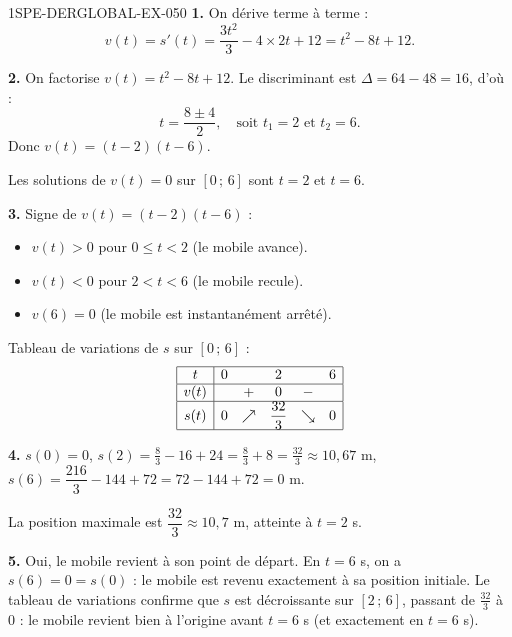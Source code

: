 \begin{corrige}{1SPE-DERGLOBAL-EX-050}
\textbf{1.} On dérive terme à terme :
\[
v(t) = s'(t) = \frac{3t^2}{3} - 4 \times 2t + 12 = t^2 - 8t + 12.
\]

\textbf{2.} On factorise $v(t) = t^2 - 8t + 12$.
Le discriminant est $\Delta = 64 - 48 = 16$, d'où :
\[
t = \frac{8 \pm 4}{2}, \quad \text{soit } t_1 = 2 \text{ et } t_2 = 6.
\]
Donc $v(t) = (t-2)(t-6)$.

Les solutions de $v(t) = 0$ sur $\left[0\,;\,6\right]$ sont $t = 2$ et $t = 6$.

\textbf{3.} Signe de $v(t) = (t-2)(t-6)$ :
\begin{itemize}
  \item $v(t) > 0$ pour $0 \leq t < 2$ (le mobile avance).
  \item $v(t) < 0$ pour $2 < t < 6$ (le mobile recule).
  \item $v(6) = 0$ (le mobile est instantanément arrêté).
\end{itemize}

Tableau de variations de $s$ sur $\left[0\,;\,6\right]$ :
\[
\begin{array}{|c|ccccc|}
\hline
t     & 0 & & 2 & & 6 \\
\hline
v(t)  &   & + & 0 & - & \\
\hline
s(t)  & 0 & \nearrow & \dfrac{32}{3} & \searrow & 0 \\
\hline
\end{array}
\]

\textbf{4.} $s(0) = 0$, $\displaystyle s(2) = \frac{8}{3} - 16 + 24 = \frac{8}{3} + 8 = \frac{32}{3} \approx 10{,}67$ m,
$s(6) = \dfrac{216}{3} - 144 + 72 = 72 - 144 + 72 = 0$ m.

La position maximale est $\boxed{\dfrac{32}{3} \approx 10{,}7 \text{ m}}$, atteinte à $t = \boxed{2}$ s.

\textbf{5.} Oui, le mobile revient à son point de départ.
En $t = 6$ s, on a $s(6) = 0 = s(0)$ : le mobile est revenu exactement à sa position initiale.
Le tableau de variations confirme que $s$ est décroissante sur $\left[2\,;\,6\right]$,
passant de $\frac{32}{3}$ à $0$ : le mobile revient bien à l'origine avant $t = 6$ s (et exactement en $t = 6$ s).
\end{corrige}
